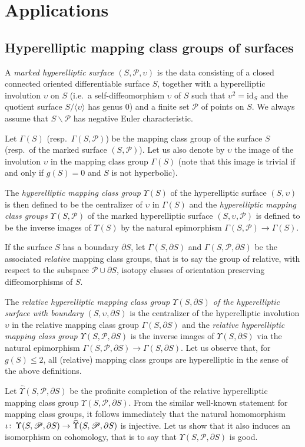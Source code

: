 \documentclass[12pt,twoside]{amsart}
\newcommand\cP{{\mathscr P}}
\newcommand\ssm{\smallsetminus}
\newcommand\G{\Gamma}
\newcommand\U{\Upsilon}
\newcommand\wh{\widehat}
\def\co{\colon\thinspace}
\def\u{{\upsilon}}
\def\dS{{\partial S}}
\theoremstyle{definition}
\begin{document}
\section{Applications}
\subsection{Hyperelliptic mapping class groups of surfaces}
A \emph{marked hyperelliptic surface $(S,\cP,\u)$} is the data consisting of a closed connected oriented differentiable surface $S$, 
together with a hyperelliptic involution $\u$ on $S$ (i.e.\ a self-diffeomorphism $\u$ of $S$ such that $\u^2=\mathrm{id}_S$ 
and the quotient surface $S/\langle\u\rangle$ has genus $0$) and a finite set $\cP$ of points on $S$. We always assume
that $S\ssm\cP$ has negative Euler characteristic.

Let $\G(S)$ (resp.\ $\G(S,\cP)$) be the mapping class group of the surface $S$ (resp.\ of the marked surface $(S,\cP)$).
Let us also denote by $\u$ the image of the involution $\u$ in the mapping class group $\G(S)$ 
(note that this image is trivial if and only if $g(S)=0$ and $S$ is not hyperbolic).

The \emph{hyperelliptic mapping class group} $\U(S)$ of the hyperelliptic surface $(S,\u)$ is then defined to be the centralizer of $\u$ in $\G(S)$
and the \emph{hyperelliptic mapping class groups $\U(S,\cP)$} of the marked hyperelliptic surface  $(S,\u,\cP)$ 
is defined to be the inverse images of $\U(S)$ by the natural epimorphism $\G(S,\cP)\to\G(S)$.

If the surface $S$ has a boundary $\partial S$, let $\G(S,\dS)$ and $\G(S,\cP,\dS)$ be the associated \emph{relative} mapping class groups,
that is to say the group of relative, with respect to the subspace $\cP\cup\dS$, isotopy classes of orientation preserving 
diffeomorphisms of $S$.

The \emph{relative hyperelliptic mapping class group $\U(S,\dS)$ of the hyperelliptic surface with boundary $(S,\u,\dS)$}
is the centralizer of the hyperelliptic involution $\u$ in the relative mapping class group 
$\G(S,\dS)$ and the \emph{relative hyperelliptic mapping class group $\U(S,\cP,\dS)$} is the inverse images of $\U(S,\dS)$
via the natural epimorphism $\G(S,\cP,\dS)\to\G(S,\dS)$.
Let us observe that, for $g(S)\leq 2$, all (relative) mapping class groups are hyperelliptic in the sense of the above definitions.

Let $\wh{\U}(S,\cP,\dS)$ be the profinite completion of the relative hyperelliptic mapping class group $\U(S,\cP,\dS)$.
From the similar well-known statement for mapping class groups, it  follows immediately that the natural homomorphism
$\iota\co\U(S,\cP,\dS)\to\wh{\U}(S,\cP,\dS)$ is injective. Let us show that it also induces an isomorphism on cohomology,
that is to say that $\U(S,\cP,\dS)$ is good.
\end{document}
